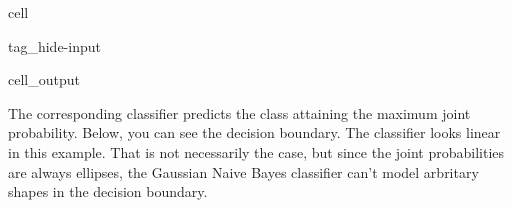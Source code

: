 \documentclass[letterpaper,10pt,english]{jupyterBook}
\begin{document}
\begin{sphinxuseclass}{cell}
\begin{sphinxuseclass}{tag_hide-input}\begin{sphinxVerbatimOutput}

\begin{sphinxuseclass}{cell_output}
\noindent{}

\end{sphinxuseclass}\end{sphinxVerbatimOutput}

\end{sphinxuseclass}
\end{sphinxuseclass}
\sphinxAtStartPar
The corresponding classifier predicts the class attaining the maximum joint probability. Below, you can see the decision boundary. The classifier looks linear in this example. That is not necessarily the case, but since the joint probabilities are always ellipses, the Gaussian Naive Bayes classifier can’t model arbritary shapes in the decision boundary.
\end{document}
